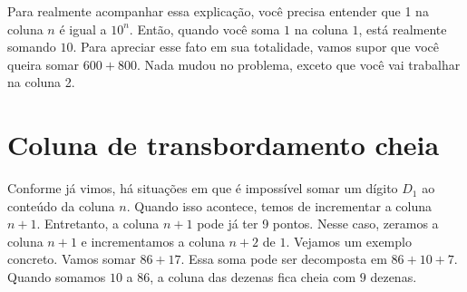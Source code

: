 \documentclass[12pt]{book}
\begin{document}
Para realmente acompanhar essa explicação,
você precisa entender que 1 na coluna
$n$ é igual a $10^n$. Então, quando você
soma $1$ na coluna $1$, está realmente
somando $10$. Para apreciar esse fato em
sua totalidade, vamos supor que você
queira somar $600+800$. Nada mudou no
problema, exceto que você vai trabalhar
na coluna 2.

\vspace{0.5cm}
\begin{minipage}{0.4\textwidth}
\end{minipage}%
%
\begin{minipage}{0.5\textwidth}
\end{minipage}

\section{Coluna de transbordamento cheia}
Conforme já vimos, há situações em
que é impossível somar um dígito $D_1$
ao conteúdo da coluna $n$. Quando isso
acontece, temos de incrementar a coluna
$n+1$. Entretanto, a coluna $n+1$ pode
já ter 9 pontos. Nesse caso, zeramos
a coluna $n+1$ e incrementamos
a coluna $n+2$ de $1$. Vejamos um
exemplo concreto. Vamos somar $86+17$.
Essa soma pode ser decomposta em
$86+10+7$. Quando somamos $10$ a $86$,
a coluna das dezenas fica cheia com
$9$ dezenas.
\end{document}
